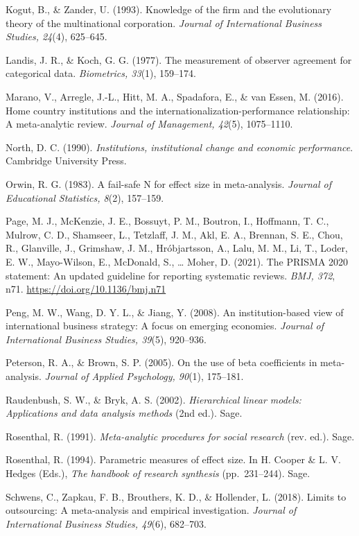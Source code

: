 \documentclass[
  12pt,a4paper]{article}
\begin{document}
Kogut, B., \& Zander, U. (1993). Knowledge of the firm and the
evolutionary theory of the multinational corporation. \emph{Journal of
International Business Studies, 24}(4), 625--645.

Landis, J. R., \& Koch, G. G. (1977). The measurement of observer
agreement for categorical data. \emph{Biometrics, 33}(1), 159--174.

Marano, V., Arregle, J.-L., Hitt, M. A., Spadafora, E., \& van Essen, M.
(2016). Home country institutions and the
internationalization-performance relationship: A meta-analytic review.
\emph{Journal of Management, 42}(5), 1075--1110.

North, D. C. (1990). \emph{Institutions, institutional change and
economic performance}. Cambridge University Press.

Orwin, R. G. (1983). A fail-safe N for effect size in meta-analysis.
\emph{Journal of Educational Statistics, 8}(2), 157--159.

Page, M. J., McKenzie, J. E., Bossuyt, P. M., Boutron, I., Hoffmann, T.
C., Mulrow, C. D., Shamseer, L., Tetzlaff, J. M., Akl, E. A., Brennan,
S. E., Chou, R., Glanville, J., Grimshaw, J. M., Hróbjartsson, A., Lalu,
M. M., Li, T., Loder, E. W., Mayo-Wilson, E., McDonald, S., \ldots{}
Moher, D. (2021). The PRISMA 2020 statement: An updated guideline for
reporting systematic reviews. \emph{BMJ, 372}, n71.
\url{https://doi.org/10.1136/bmj.n71}

Peng, M. W., Wang, D. Y. L., \& Jiang, Y. (2008). An institution-based
view of international business strategy: A focus on emerging economies.
\emph{Journal of International Business Studies, 39}(5), 920--936.

Peterson, R. A., \& Brown, S. P. (2005). On the use of beta coefficients
in meta-analysis. \emph{Journal of Applied Psychology, 90}(1), 175--181.

Raudenbush, S. W., \& Bryk, A. S. (2002). \emph{Hierarchical linear
models: Applications and data analysis methods} (2nd ed.). Sage.

Rosenthal, R. (1991). \emph{Meta-analytic procedures for social
research} (rev. ed.). Sage.

Rosenthal, R. (1994). Parametric measures of effect size. In H. Cooper
\& L. V. Hedges (Eds.), \emph{The handbook of research synthesis}
(pp.~231--244). Sage.

Schwens, C., Zapkau, F. B., Brouthers, K. D., \& Hollender, L. (2018).
Limits to outsourcing: A meta-analysis and empirical investigation.
\emph{Journal of International Business Studies, 49}(6), 682--703.
\end{document}
